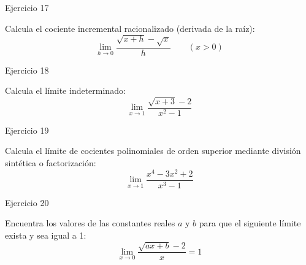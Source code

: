 \documentclass[aspectratio=169]{beamer}
\begin{document}
\begin{frame}{Ejercicio 17}
  \begin{mwejercicio}
    Calcula el cociente incremental racionalizado (derivada de la raíz):
    $$\lim_{h \to 0} \frac{\sqrt{x + h} - \sqrt{x}}{h} \qquad (x > 0)$$
  \end{mwejercicio}
  \vspace{3.5cm}
\end{frame}
\begin{frame}{Ejercicio 18}
  \begin{mwejercicio}
    Calcula el límite indeterminado:
    $$\lim_{x \to 1} \frac{\sqrt{x + 3} - 2}{x^2 - 1}$$
  \end{mwejercicio}
  \vspace{3.5cm}
\end{frame}
\begin{frame}{Ejercicio 19}
  \begin{mwejercicio}
    Calcula el límite de cocientes polinomiales de orden superior mediante división sintética o factorización:
    $$\lim_{x \to 1} \frac{x^4 - 3x^2 + 2}{x^3 - 1}$$
  \end{mwejercicio}
  \vspace{3.5cm}
\end{frame}
\begin{frame}{Ejercicio 20}
  \begin{mwejercicio}
    Encuentra los valores de las constantes reales $a$ y $b$ para que el siguiente límite exista y sea igual a 1:
    $$\lim_{x \to 0} \frac{\sqrt{ax + b} - 2}{x} = 1$$
  \end{mwejercicio}
  \vspace{3.5cm}
\end{frame}
\end{document}
